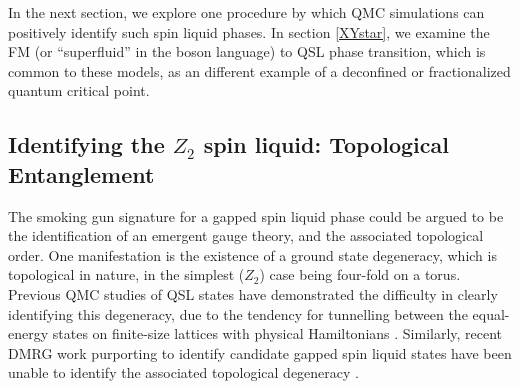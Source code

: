 \documentclass[range]{ar2e}
\begin{document}

In the next section, we explore one procedure by which QMC simulations can positively identify such spin liquid phases.  In section \ref{XYstar}, we examine the FM (or ``superfluid'' in the boson language) to QSL phase transition, which is common to these models, as an different example of a deconfined or fractionalized quantum critical point.

\subsection{Identifying the $Z_2$ spin liquid: Topological Entanglement} \label{topoEEsec}

The smoking gun signature for a gapped spin liquid phase could be argued to be the identification of an emergent gauge theory,
and the associated topological order.  One manifestation is the existence of a ground state degeneracy, which is topological in nature, in the simplest ($Z_2$) case being four-fold on a torus.  Previous QMC studies of QSL states have demonstrated the difficulty in clearly identifying this degeneracy, due to the tendency for tunnelling between the equal-energy states on finite-size lattices with physical Hamiltonians \cite{Isakov1}.  Similarly, recent DMRG work purporting to identify candidate gapped spin liquid states have been unable to identify the associated topological degeneracy \cite{Yan,J1J2}.
\end{document}
